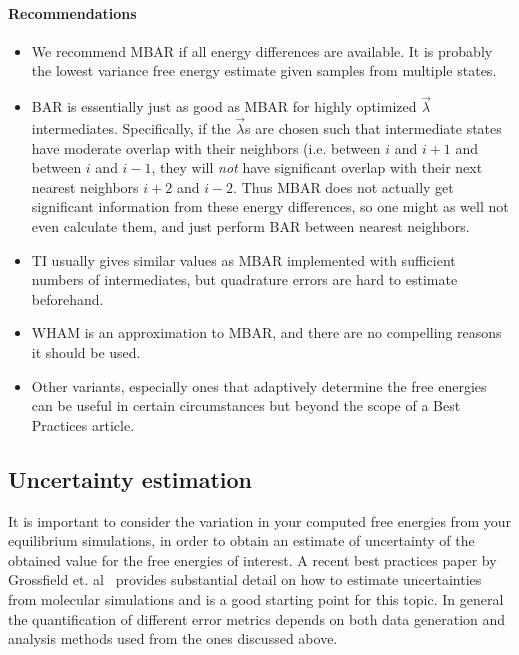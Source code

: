 \documentclass[9pt,bestpractices]{livecoms}
\begin{document}
\paragraph{Recommendations}
\begin{itemize}
\item We recommend MBAR if all energy differences are available. It is probably the lowest variance free energy estimate given samples from multiple states.
\item BAR is essentially just as good as MBAR for highly optimized $\vec{\lambda}$ intermediates. Specifically, if the $\vec{\lambda}$s are chosen such that intermediate states have moderate overlap with their neighbors (i.e. between $i$ and $i+1$ and between $i$ and $i-1$, they will \textit{not} have significant overlap with their next nearest neighbors $i+2$ and $i-2$. Thus MBAR does not actually get significant information from these energy differences, so one might as well not even calculate them, and just perform BAR between nearest neighbors.~\cite{paliwal2011benchmark} 
\item TI usually gives similar values as MBAR implemented with sufficient numbers of intermediates, but quadrature errors are hard to estimate beforehand.~\cite{paliwal2011benchmark}
\item WHAM is an approximation to MBAR, and there are no compelling reasons it should be used. 
\item Other variants, especially ones that adaptively determine the free energies can be  useful in certain circumstances but beyond the scope of a Best Practices article.
\end{itemize}
%
\subsection{Uncertainty estimation}
\label{subsec:uncertainty}
It is important to consider the variation in your computed free energies from your equilibrium simulations, in order  to  obtain an estimate of  uncertainty of the obtained value for the free energies of interest. A recent best practices paper by Grossfield et. al~\cite{grossfield2018best} provides substantial detail on how to estimate uncertainties from molecular simulations and is a good starting point for this topic. 
In general the quantification of different error metrics depends on both data generation and analysis methods  used from the ones discussed above. 
\end{document}
